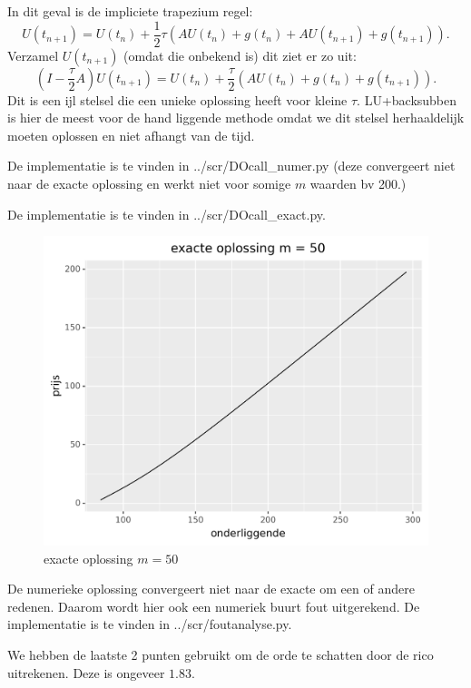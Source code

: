 \documentclass{article}
\begin{document}
In dit geval is de impliciete trapezium regel:
\[
  U(t_{n+1}) = U(t_{n}) + \frac{1}{2} \tau (A U(t_{n}) + g(t_{n}) + A U(t_{n+1}) + g(t_{n+1}))
.\]
Verzamel $U(t_{n+1})$ (omdat die onbekend is) dit ziet er zo uit:
\[
  (I-\frac{\tau}{2}A)U(t_{n+1}) = U(t_{n}) + \frac{\tau}{2} (AU(t_{n}) + g(t_{n})+ g(t_{n+1}))
.\]
Dit is een ijl stelsel die een unieke oplossing heeft voor kleine $\tau$.
LU+backsubben is hier de meest voor de hand liggende methode omdat we dit stelsel
herhaaldelijk moeten oplossen en niet afhangt van de tijd.

De implementatie is te vinden in ../scr/DOcall\_numer.py (deze convergeert niet
naar de exacte oplossing en werkt niet voor somige $m$ waarden bv 200.) 

De implementatie is te vinden in ../scr/DOcall\_exact.py.

\begin{figure}
\includegraphics[width=\linewidth]{oefening6.png}
\caption{exacte oplossing $m = 50$ }\label{fig:opl50}
\end{figure}

De numerieke oplossing convergeert niet naar de exacte om een of andere redenen.
Daarom wordt hier ook een numeriek buurt fout uitgerekend.
De implementatie is te vinden in ../scr/foutanalyse.py.

We hebben de laatste 2 punten gebruikt om de orde te schatten door de rico uitrekenen.
Deze is ongeveer $1.83$.
\end{document}
